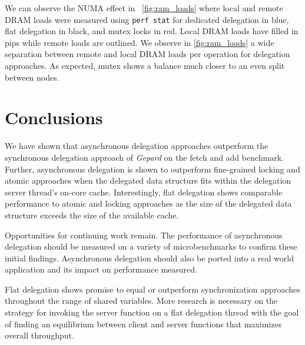 \documentclass{uicthesi}
\begin{document}
We can observe the NUMA effect in ~\ref{fig:ram_loads} where local and remote DRAM loads were measured using  \texttt{perf stat} for dedicated delegation in blue, flat delegation in black, and mutex locks in red. Local DRAM loads have filled in pips while remote loads are outlined. We observe in \ref{fig:ram_loads} a wide separation between remote and local DRAM loads per operation for delegation approaches. As expected, mutex shows a balance much closer to an even split between nodes. 


\chapter{Conclusions}
We have shown that asynchronous delegation approaches outperform the synchronous delegation approach of \textit{Gepard} on the fetch and add benchmark. Further, asynchronous delegation is shown to outperform fine-grained locking and atomic approaches when the delegated data structure fits within the delegation server thread's on-core cache. Interestingly, flat delegation shows comparable performance to atomic and locking approaches as the size of the delegated data structure exceeds the size of the available cache. 

Opportunities for continuing work remain. The performance of asynchronous delegation should be measured on a variety of microbenchmarks to confirm these initial findings. Asynchronous delegation should also be ported into a real world application and its impact on performance measured. 

Flat delegation shows promise to equal or outperform synchronization approaches throughout the range of shared variables. More research is necessary on the strategy for invoking the server function on a flat delegation thread with the goal of finding an equilibrium between client and server functions that maximizes overall throughput. 
\end{document}
